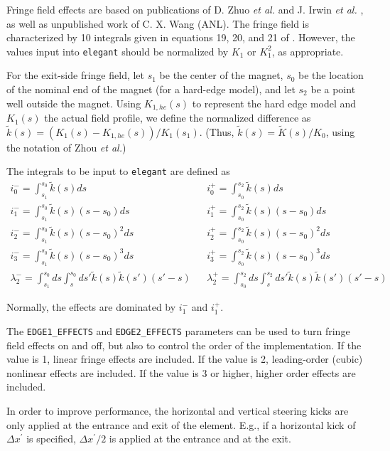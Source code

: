 Fringe field effects  are based on publications of D.  Zhuo {\em et al.} \cite{Zhou-IPAC10} and  J. Irwin {\em et
  al.} \cite{Irwin-PAC95}, as well as unpublished work of C. X. Wang (ANL).  The fringe field is characterized by 
10 integrals given in equations 19, 20, and 21 of \cite{Zhou-IPAC10}.  However, the values input into {\tt elegant}
should be normalized by $K_1$ or $K_1^2$, as appropriate.

For the exit-side fringe field, let $s_1$ be the center of the magnet, $s_0$ be the location of the nominal end of the magnet
(for a hard-edge model), and let $s_2$ be a point well outside the magnet.  
Using $K_{1,he}(s)$ to represent the hard edge model and $K_1(s)$ the actual field profile, we 
define the normalized difference as $\tilde{k}(s) = (K_1(s) - K_{1,he}(s))/K_1(s_1)$.  (Thus, $\tilde{k}(s) = \tilde{K}(s)/K_0$, using
the notation of Zhou {\em et al.})

The integrals to be input to {\tt elegant} are defined as 
\begin{eqnarray}
i_0^- = \int_{s_1}^{s_0} \tilde{k}(s) ds & & i_0^+ = \int_{s_0}^{s_2} \tilde{k}(s) ds \\
i_1^- = \int_{s_1}^{s_0} \tilde{k}(s) (s-s_0) ds & & i_1^+ = \int_{s_0}^{s_2} \tilde{k}(s) (s-s_0) ds \\
i_2^- = \int_{s_1}^{s_0} \tilde{k}(s) (s-s_0)^2 ds & & i_2^+ = \int_{s_0}^{s_2} \tilde{k}(s) (s-s_0)^2 ds \\
i_3^- = \int_{s_1}^{s_0} \tilde{k}(s) (s-s_0)^3 ds & & i_3^+ = \int_{s_0}^{s_2} \tilde{k}(s) (s-s_0)^3 ds \\
\lambda_2^- = \int_{s_1}^{s_0} ds \int_s^{s_0} ds\prime \tilde{k}(s) \tilde{k}(s\prime) (s\prime-s) & & 
\lambda_2^+ = \int_{s_0}^{s_2} ds \int_s^{s_2} ds\prime \tilde{k}(s) \tilde{k}(s\prime) (s\prime-s) 
\end{eqnarray}

Normally, the effects are dominated by $i_1^-$ and $i_1^+$.  

The \verb|EDGE1_EFFECTS| and \verb|EDGE2_EFFECTS| parameters can be used to turn fringe field effects on and off, but also
to control the order of the implementation.  If the value is 1, linear fringe effects are included.  If the value is 2, 
leading-order (cubic) nonlinear effects are included.  If the value is 3 or higher, higher order effects are included.

In order to improve performance, the horizontal and vertical steering kicks are only applied at the entrance and exit
of the element. E.g., if a horizontal kick of $\Delta x^\prime$ is specified, $\Delta x^\prime/2$ is applied at
the entrance and at the exit.

